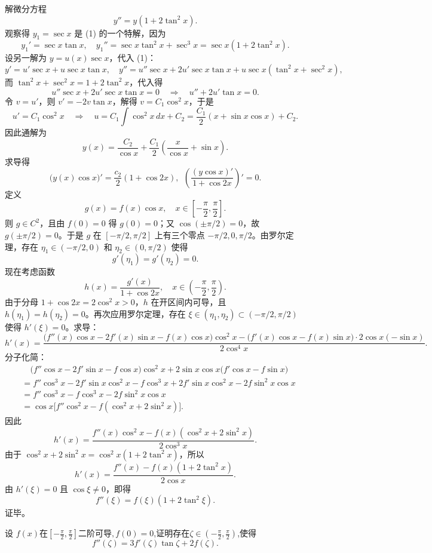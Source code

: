 \begin{solution}
解微分方程
\[
y'' = y(1+2\tan^2 x). \tag{1}
\]
观察得 $y_1 = \sec x$ 是 (1) 的一个特解，因为
\[
y_1' = \sec x \tan x,\quad y_1'' = \sec x \tan^2 x + \sec^3 x = \sec x (1+2\tan^2 x).
\]
设另一解为 $y = u(x) \sec x$，代入 (1)：
\[
y' = u'\sec x + u\sec x\tan x,\quad y'' = u''\sec x + 2u'\sec x\tan x + u\sec x(\tan^2 x + \sec^2 x),
\]
而 $\tan^2 x + \sec^2 x = 1+2\tan^2 x$，代入得
\[
u''\sec x + 2u'\sec x\tan x = 0 \quad\Longrightarrow\quad u'' + 2u'\tan x = 0.
\]
令 $v = u'$，则 $v' = -2v\tan x$，解得 $v = C_1 \cos^2 x$，于是
\[
u' = C_1 \cos^2 x \quad\Longrightarrow\quad u = C_1 \int \cos^2 x\,dx + C_2 = \frac{C_1}{2}\left(x + \sin x\cos x\right) + C_2.
\]
因此通解为
\[
y(x) = \frac{C_2}{\cos x} + \frac{C_1}{2}\left(\frac{x}{\cos x} + \sin x\right).
\]
求导得
\[
\bigl(y(x)\cos x\bigr)' = \frac{c_2}{2}(1 + \cos 2x),~~\left(\frac{(y\cos x)'}{1+\cos 2x}\right)' = 0.
\]
定义
\[
g(x) = f(x)\cos x,\quad x\in\left[-\frac{\pi}{2},\frac{\pi}{2}\right].
\]
则 $g\in C^2$，且由 $f(0)=0$ 得 $g(0)=0$；又 $\cos(\pm\pi/2)=0$，故 $g(\pm\pi/2)=0$。于是 $g$ 在 $[-\pi/2,\pi/2]$ 上有三个零点 $-\pi/2,0,\pi/2$。由罗尔定理，存在 $\eta_1\in(-\pi/2,0)$ 和 $\eta_2\in(0,\pi/2)$ 使得
\[
g'(\eta_1)=g'(\eta_2)=0.
\]
现在考虑函数
\[
h(x) = \frac{g'(x)}{1+\cos 2x},\quad x\in\left(-\frac{\pi}{2},\frac{\pi}{2}\right).
\]
由于分母 $1+\cos 2x = 2\cos^2 x > 0$，$h$ 在开区间内可导，且 $h(\eta_1)=h(\eta_2)=0$。再次应用罗尔定理，存在 $\xi\in(\eta_1,\eta_2)\subset(-\pi/2,\pi/2)$ 使得 $h'(\xi)=0$。求导：
\[
h'(x) = \frac{\bigl(f''(x)\cos x - 2f'(x)\sin x - f(x)\cos x\bigr)\cos^2 x - \bigl(f'(x)\cos x - f(x)\sin x\bigr)\cdot 2\cos x(-\sin x)}{2\cos^4 x}.
\]
分子化简：
\begin{align*}
&\quad \bigl(f''\cos x - 2f'\sin x - f\cos x\bigr)\cos^2 x + 2\sin x\cos x\bigl(f'\cos x - f\sin x\bigr) \\
&= f''\cos^3 x - 2f'\sin x\cos^2 x - f\cos^3 x + 2f'\sin x\cos^2 x - 2f\sin^2 x\cos x \\
&= f''\cos^3 x - f\cos^3 x - 2f\sin^2 x\cos x \\
&= \cos x\bigl[ f''\cos^2 x - f(\cos^2 x + 2\sin^2 x) \bigr].
\end{align*}
因此
\[
h'(x) = \frac{f''(x)\cos^2 x - f(x)(\cos^2 x + 2\sin^2 x)}{2\cos^3 x}.
\]
由于 $\cos^2 x + 2\sin^2 x = \cos^2 x(1+2\tan^2 x)$，所以
\[
h'(x) = \frac{f''(x) - f(x)(1+2\tan^2 x)}{2\cos x}.
\]
由 $h'(\xi)=0$ 且 $\cos\xi \neq 0$，即得
\[
f''(\xi) = f(\xi)(1+2\tan^2\xi).
\]
证毕。
\end{solution}
\newpage
\begin{example}[$f''\left(\zeta\right)=3f'\left(\zeta\right)\tan\zeta+2f\left(\zeta\right)$]
    设 $f\left(x\right)$在$\left[-\frac\pi2,\frac\pi2\right]$二阶可导$,f\left(0\right)=0$,证明存在$\zeta\in\left(-\frac\pi2,\frac\pi2\right)$,使得
$$f''\left(\zeta\right)=3f'\left(\zeta\right)\tan\zeta+2f\left(\zeta\right).$$
\end{example}
